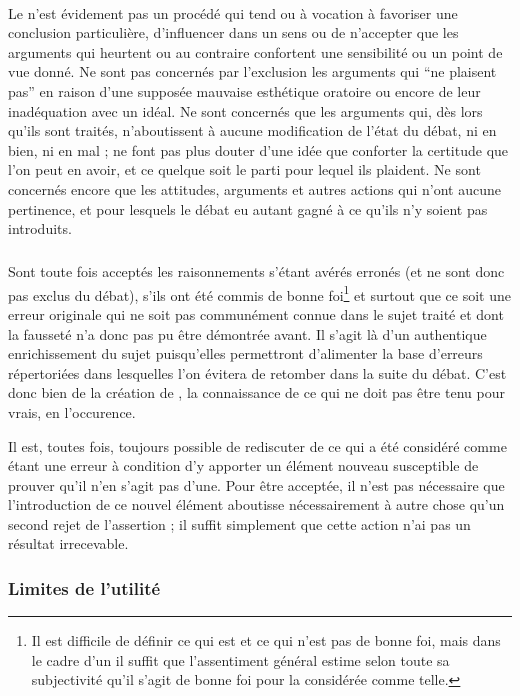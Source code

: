 \paragraph*{}
Le \mainabbr{} n’est évidement pas un procédé qui tend ou à vocation à favoriser une conclusion particulière, d’influencer dans un sens ou de n’accepter que les arguments qui heurtent ou au contraire confortent une sensibilité ou un point de vue donné. Ne sont pas concernés par l’exclusion les arguments qui \enquote{ne plaisent pas} en raison d’une supposée mauvaise esthétique oratoire ou encore de leur inadéquation avec un idéal. Ne sont concernés que les arguments qui, dès lors qu’ils sont traités, n’aboutissent à aucune modification de l’état du débat, ni en bien, ni en mal ; ne font pas plus douter d’une idée que conforter la certitude que l’on peut en avoir, et ce quelque soit le parti pour lequel ils plaident. Ne sont concernés encore que les attitudes, arguments et autres actions qui n’ont aucune pertinence, et pour lesquels le débat eu {autant} gagné à ce qu’ils n’y soient pas introduits.

\subparagraph*{}
Sont toute fois acceptés les raisonnements s’étant avérés erronés (et ne sont donc pas exclus du débat), s’ils ont été commis de bonne foi\footnote{Il est difficile de définir ce qui est et ce qui n’est pas de bonne foi, mais dans le cadre d’un \mainabbr{} il suffit que l’assentiment général estime selon toute sa subjectivité qu’il s’agit de bonne foi pour la considérée comme telle.}
et surtout que ce soit une erreur originale qui ne soit pas communément connue dans le sujet traité et dont la fausseté n’a donc pas pu être démontrée avant. Il s’agit là d’un authentique enrichissement du sujet puisqu’elles permettront d’alimenter la base d’erreurs répertoriées dans lesquelles l’on évitera de retomber dans la suite du débat. C’est donc bien de la création de , la connaissance de ce qui ne doit pas être tenu pour vrais, en l’occurence.

Il est, toutes fois, toujours possible de rediscuter de ce qui a été considéré comme étant une erreur à condition d’y apporter un élément nouveau susceptible de prouver qu’il n’en s’agit pas d’une. Pour être acceptée, il n’est pas nécessaire que l’introduction de ce nouvel élément aboutisse nécessairement à autre chose qu’un second rejet de l’assertion ; il suffit simplement que cette action n’ai pas un résultat  irrecevable.

\subsubsection{Limites de l’utilité}
